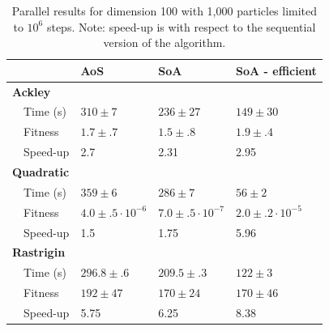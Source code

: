 \begin{table}[]
  \caption{Parallel results for dimension 100 with 1,000 particles limited to
    $10^6$ steps. Note: speed-up is with respect to the sequential version of
    the algorithm.}
  \label{tab:results}
\begin{tabular}{lllll}\toprule
  &                           & \textbf{AoS}             & \textbf{SoA}         & \textbf{SoA - efficient}     \\\midrule
\multicolumn{2}{l}{\textbf{Ackley}}    &                         &                         &                     \\
  & Time (s)                  & $310 \pm 7$             & $236 \pm 27$            & $149 \pm 30$        \\
  & Fitness                   & $1.7 \pm .7$           & $1.5 \pm .8$            & $1.9 \pm .4$        \\
  & Speed-up  & 2.7                     & 2.31                    & 2.95                \\
\multicolumn{2}{l}{\textbf{Quadratic}} &                         &                         &                     \\
  & Time (s)                  & $359 \pm 6$             & $286 \pm 7$             & $56 \pm 2$          \\
  & Fitness                   & $4.0 \pm .5 \cdot 10^{-6}$ & $7.0 \pm .5 \cdot10^{-7}$
                                                                 &
                                                                            $2.0
                                                                   \pm .2 \cdot
                                                                            10^{-5}$ \\
  & Speed-up  & 1.5                     & 1.75                    & 5.96                \\
\multicolumn{2}{l}{\textbf{Rastrigin}} &                         &                         &                     \\
  & Time (s)                  & $296.8 \pm .6$          & $209.5 \pm .3$          & $122 \pm 3$         \\
  & Fitness                   & $192 \pm 47$            & $170 \pm 24$            & $170 \pm 46$        \\
  & Speed-up  & 5.75                    & 6.25                    & 8.38           \\\bottomrule    
\end{tabular}
\end{table}

